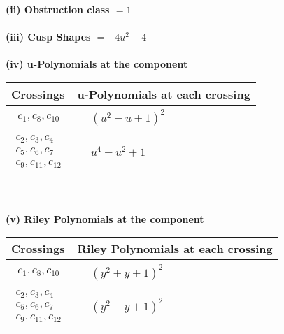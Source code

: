 \documentclass[1p]{elsarticle_modified}
\theoremstyle{definition}
\begin{document}
\flushleft \textbf{(ii) Obstruction class $= 1$}\\~\\
\flushleft \textbf{(iii) Cusp Shapes $= -4 u^2-4$}\\~\\
\newpage\renewcommand{\arraystretch}{1}
\flushleft \textbf{(iv) u-Polynomials at the component}\newline \\
\begin{tabular}{m{50pt}|m{274pt}}
Crossings & \hspace{64pt}u-Polynomials at each crossing \\
\hline $$\begin{aligned}c_{1},c_{8},c_{10}\end{aligned}$$&$\begin{aligned}
&(u^2- u+1)^2
\end{aligned}$\\
\hline $$\begin{aligned}c_{2},c_{3},c_{4}\\c_{5},c_{6},c_{7}\\c_{9},c_{11},c_{12}\end{aligned}$$&$\begin{aligned}
&u^4- u^2+1
\end{aligned}$\\
\hline
\end{tabular}\\~\\
\newpage\renewcommand{\arraystretch}{1}
\flushleft \textbf{(v) Riley Polynomials at the component}\newline \\
\begin{tabular}{m{50pt}|m{274pt}}
Crossings & \hspace{64pt}Riley Polynomials at each crossing \\
\hline $$\begin{aligned}c_{1},c_{8},c_{10}\end{aligned}$$&$\begin{aligned}
&(y^2+y+1)^2
\end{aligned}$\\
\hline $$\begin{aligned}c_{2},c_{3},c_{4}\\c_{5},c_{6},c_{7}\\c_{9},c_{11},c_{12}\end{aligned}$$&$\begin{aligned}
&(y^2- y+1)^2
\end{aligned}$\\
\hline
\end{tabular}\\~\\
\end{document}
